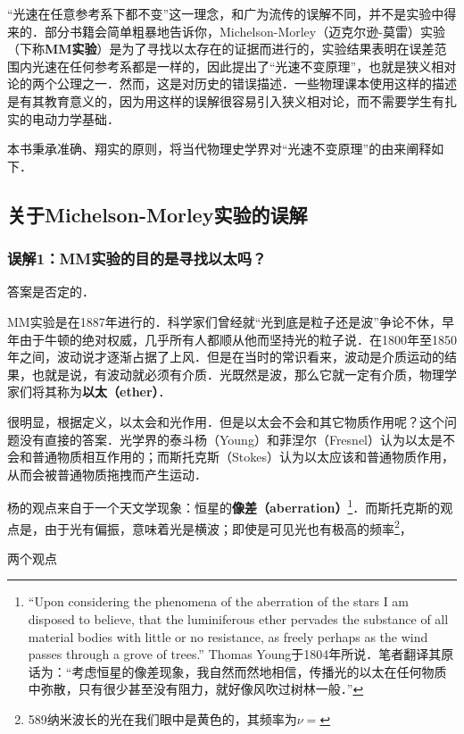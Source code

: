 
“光速在任意参考系下都不变”这一理念，和广为流传的误解不同，并不是实验中得来的．部分书籍会简单粗暴地告诉你，Michelson-Morley（迈克尔逊-莫雷）实验（下称\textbf{MM实验}）是为了寻找以太存在的证据而进行的，实验结果表明在误差范围内光速在任何参考系都是一样的，因此提出了“光速不变原理”，也就是狭义相对论的两个公理之一．然而，这是对历史的错误描述．一些物理课本使用这样的描述是有其教育意义的，因为用这样的误解很容易引入狭义相对论，而不需要学生有扎实的电动力学基础．

本书秉承准确、翔实的原则，将当代物理史学界对“光速不变原理”的由来阐释如下．

\subsection{关于Michelson-Morley实验的误解}

\subsubsection{误解1：MM实验的目的是寻找以太吗？}

答案是否定的．

MM实验是在1887年进行的．科学家们曾经就“光到底是粒子还是波”争论不休，早年由于牛顿的绝对权威，几乎所有人都顺从他而坚持光的粒子说．在1800年至1850年之间，波动说才逐渐占据了上风．但是在当时的常识看来，波动是介质运动的结果，也就是说，有波动就必须有介质．光既然是波，那么它就一定有介质，物理学家们将其称为\textbf{以太（ether）}．

很明显，根据定义，以太会和光作用．但是以太会不会和其它物质作用呢？这个问题没有直接的答案．光学界的泰斗杨（Young）和菲涅尔（Fresnel）认为以太是不会和普通物质相互作用的；而斯托克斯（Stokes）认为以太应该和普通物质作用，从而会被普通物质拖拽而产生运动．

杨的观点来自于一个天文学现象：恒星的\textbf{像差（aberration）}\footnote{“Upon considering the phenomena
of the aberration of the stars I am disposed to believe, that the luminiferous ether pervades the substance of all material bodies with little or no resistance, as freely perhaps as the wind passes through a grove of trees.” Thomas Young于1804年所说．笔者翻译其原话为：“考虑恒星的像差现象，我自然而然地相信，传播光的以太在任何物质中弥散，只有很少甚至没有阻力，就好像风吹过树林一般．”}．而斯托克斯的观点是，由于光有偏振，意味着光是横波；即使是可见光也有极高的频率\footnote{589纳米波长的光在我们眼中是黄色的，其频率为$\nu=$}，%

两个观点


